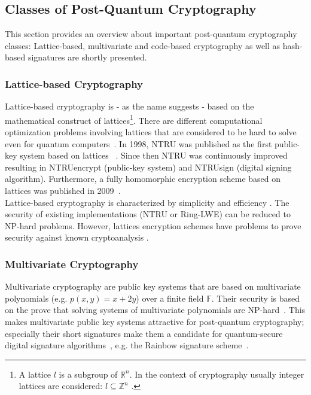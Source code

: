 \subsection{Classes of Post-Quantum Cryptography} \label{sec:classes_pqc}

This section provides an overview about important post-quantum cryptography classes: Lattice-based, multivariate and code-based cryptography as well as hash-based signatures are shortly presented. 

\subsubsection{Lattice-based Cryptography}
Lattice-based cryptography is - as the name suggests - based on the mathematical construct of lattices\footnote{A lattice $l$ is a subgroup of $\mathbb{R}^n$. In the context of cryptography usually integer lattices are considered: $l \subseteq \mathbb{Z}^n$ \parencite{chi2015lattice}.}. There are different computational optimization problems involving lattices that are considered to be hard to solve even for quantum computers~\parencite{chi2015lattice}. In 1998, NTRU was published as the first public-key system based on lattices ~\parencite{hoffstein1998ntru}. Since then NTRU was continuously improved resulting in NTRUencrypt (public-key system) and NTRUsign (digital signing algorithm). Furthermore, a fully homomorphic encryption scheme based on lattices was published in 2009~\parencite{gentry2009fully}.\\
Lattice-based cryptography is characterized by simplicity and efficiency \parencite{chen2016report}. The security of existing implementations (NTRU or Ring-LWE) can be reduced to NP-hard problems. However, lattices encryption schemes have problems to prove security against known cryptoanalysis \parencite{chen2016report}.
\subsubsection{Multivariate Cryptography}
Multivariate cryptography are public key systems that are based on multivariate polynomials (e.g. $p(x,y)=x+2y$) over a finite field $\mathbb{F}$. Their security is based on the prove that solving systems of multivariate polynomials are NP-hard~\parencite{hartmanis1982computers}. This makes multivariate public key systems attractive for post-quantum cryptography; especially their short signatures make them a candidate for quantum-secure digital signature algorithms~\parencite{ding2017current}, e.g. the Rainbow signature scheme~\parencite{ding2005rainbow}.
